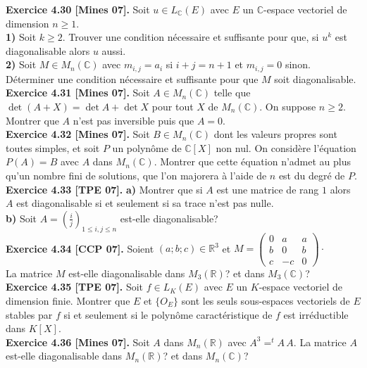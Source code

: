 \documentclass[a4paper,12pt,francais]{article}
\newcommand{\field}[1]{\mathbb{#1}}
\newcommand{\R}{\field{R}}
\newcommand{\C}{\field{C}}
\begin{document}
\noindent
{\bf Exercice 4.30 [Mines 07].} Soit $u \in L_\C(E)$ avec $E$ un $\C$-espace vectoriel de dimension $n\geqslant 1$.\\
{\bf 1)} Soit $k \geqslant 2$. Trouver une condition nécessaire et suffisante pour que, si $u^k$ est diagonalisable alors $u$ aussi.\\
{\bf 2)} Soit $M \in M_n(\C)$ avec $m_{i,j}=a_i$ si $i+j=n+1$ et $m_{i,j}=0$ sinon. Déterminer une condition nécessaire et suffisante pour que $M$ soit diagonalisable.\\

\noindent
{\bf Exercice 4.31 [Mines 07].} Soit $A\in M_n(\C)$ telle que $\det (A+X)=\det A +\det X$ pour tout $X$ de $M_n(\C)$. On suppose $n\geqslant 2$. Montrer que $A$ n'est pas inversible puis que $A=0$.\\

\noindent
{\bf Exercice 4.32 [Mines 07].} Soit $B\in M_n(\C)$ dont les valeurs propres sont toutes simples, et soit $P$ un polynôme de $\C[X]$ non nul. On considère l'équation $P(A)=B$ avec $A$ dans $M_n(\C)$. Montrer que cette équation n'admet au plus qu'un nombre fini de solutions, que l'on majorera à l'aide de $n$ est du degré de $P$.\\

\noindent
{\bf Exercice 4.33 [TPE 07].} {\bf a)} Montrer que si $A$ est une matrice de rang $1$ alors $A$ est diagonalisable si et seulement si sa trace n'est pas nulle.\\
{\bf b)} Soit $A=\left(\frac{i}{j}\right)_{1\leqslant i,j\leqslant n}$ est-elle diagonalisable?\\  

\noindent
{\bf Exercice 4.34 [CCP 07].} Soient $(a;b;c)\in \R^3$ et $M=\left(\begin{array}{ccc}
0&a&a\\
b&0&b\\
c&-c&0 \end{array}\right)\cdot$\\
La matrice $M$ est-elle diagonalisable dans $M_3(\R)$? et dans $M_3(\C)$?\\

\noindent
{\bf Exercice 4.35 [TPE 07].} Soit $f \in L_K(E)$ avec $E$ un $K$-espace vectoriel de dimension finie. Montrer que $E$ et $\{O_E\}$ sont les seuls sous-espaces vectoriels de $E$ stables par $f$ si et seulement si le polynôme caractéristique de $f$ est irréductible dans $K[X]$.\\

\noindent
{\bf Exercice 4.36 [Mines 07].} Soit $A$ dans $M_n(\R)$ avec $A^3=^tA \, A$. La matrice $A$ est-elle diagonalisable dans $M_n(\R)$? et dans $M_n(\C)$?\\
\end{document}
